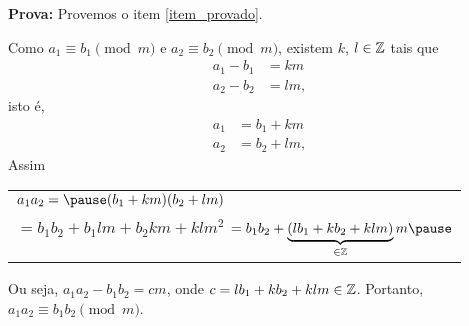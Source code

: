 \documentclass{beamer}
\begin{document}
    \begin{frame}
        \noindent\textbf{Prova: }
            Provemos o item \ref{item_provado}.\pause
            
            Como $a_{1}\equiv b_{1}\pmod{m}$ \pause e $a_{2}\equiv b_{2}\pmod{m}$, \pause existem $k$, $l \in \mathbb{Z}$ tais que\pause
            \begin{align*}
                a_1 - b_1 &= km\\
                a_2 - b_2 &= lm,
            \end{align*}\pause
            isto \'e,
            \begin{align*}
                a_1 &= b_1 + km\\
                a_2 &= b_2 + lm,
            \end{align*}\pause
            Assim
            \begin{center}
                \begin{tabular}{l}
                    $a_1a_2 = \pause (b_1 + km)(b_2 + lm)$ \\ \pause $= b_1b_2 + b_1lm + b_2km + klm^2 $ \pause $= b_1b_2 + \underbrace{(lb_{1}+kb_{2}+klm)}_{\in \z}m\pause$    
                \end{tabular}
            \end{center}\pause
            
            Ou seja, $a_1a_2 - b_1b_2 = cm$, \pause onde $c = lb_1 + kb_2 + klm \in \mathbb{Z}$. \pause Portanto, $a_1a_2 \equiv b_1b_2 \pmod{m}$.\hspace{.5cm} \qedsymbol\pause
    \end{frame}
\end{document}
